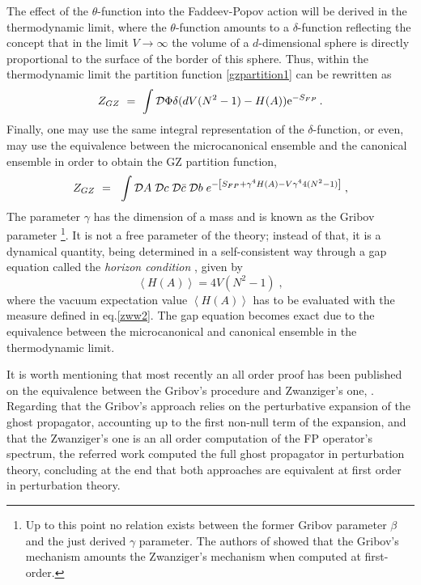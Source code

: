 The effect of the $\theta$-function into the Faddeev-Popov action will be derived in the
thermodynamic limit, where the $\theta$-function amounts to a $\delta$-function reflecting the
concept that in the limit $V\to \infty$ the volume of a $d$-dimensional sphere is directly
proportional to the surface of the border of this sphere. Thus, within the thermodynamic limit
the partition function \eqref{gzpartition1} can be rewritten as
\begin{eqnarray}
Z_{GZ} ~=~ \int {\cal D} \Phi \delta (dV(N^{2}-1) - H(A))\mathrm{e}^{-S_{FP}}\,.
\label{gzpartition2}
\end{eqnarray}
Finally, one  may use the same integral representation of the $\delta$-function, or even, may
use the equivalence between the microcanonical ensemble and the canonical ensemble in order to
obtain the GZ partition function,
\begin{equation}
 Z_{GZ} ~=~ \;
\int {\cal D}A\;{\cal D}c\;{\cal D}\bar{c} \; {\cal D} b \; e^{-\left[  S_{FP}+\gamma^4 H(A)
-V\gamma^4 4(N^2-1) \right]} \;, 
\label{zww2}
\end{equation}
The parameter $\gamma$ has the dimension of a mass
and is known as the Gribov parameter \footnote{Up to this point no relation exists between the
former Gribov parameter $\beta$ and the just derived $\gamma$ parameter. The authors of
\cite{Capri:2012wx} showed that the Gribov's mechanism amounts the Zwanziger's mechanism when
computed at first-order.}. It is not a free parameter of the theory; instead of
that, it is a dynamical quantity, being determined in a self-consistent way through a gap
equation called the \emph{horizon condition} \cite{Vandersickel:2012tz,Zwanziger:1982na,
Zwanziger:1988jt,Zwanziger:1989mf, Zwanziger:1990tn,Zwanziger:1992qr}, given by 
\begin{equation}
\left\langle H(A)   \right\rangle = 4V \left(  N^{2}-1\right) \;,   
\label{hc2}
\end{equation}
where the vacuum expectation value $\left\langle H(A)  \right\rangle$  has to be evaluated with
the measure defined in eq.\eqref{zww2}. The gap equation becomes exact due to the equivalence
between the microcanonical and canonical ensemble in the thermodynamic limit.

It is worth mentioning that most recently an all order proof has been published on the
equivalence between the Gribov's procedure and Zwanziger's one, \cite{Capri:2012wx}. Regarding
that the Gribov's approach relies on the perturbative expansion of the ghost propagator,
accounting up to the first non-null term of the expansion, and that the Zwanziger's one is an
all order computation of the FP operator's spectrum, the referred work computed the full
ghost propagator in perturbation theory, concluding at the end that both approaches are
equivalent at first order in perturbation theory.




